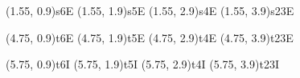 \pnode(1.55, 0.9){s6E}{}
\pnode(1.55, 1.9){s5E}{}
\pnode(1.55, 2.9){s4E}{}
\pnode(1.55, 3.9){s23E}{}

\pnode(4.75, 0.9){t6E}{}
\pnode(4.75, 1.9){t5E}{}
\pnode(4.75, 2.9){t4E}{}
\pnode(4.75, 3.9){t23E}{}

\pnode(5.75, 0.9){t6I}{}
\pnode(5.75, 1.9){t5I}{}
\pnode(5.75, 2.9){t4I}{}
\pnode(5.75, 3.9){t23I}{}

